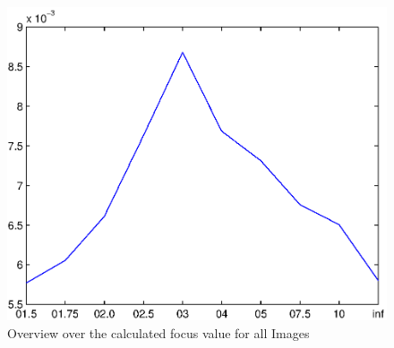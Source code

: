 \documentclass[
a4paper,     %
12pt         %
]{scrartcl}  %
\begin{document}
\begin{figure}[ht!]
 \centering
 \includegraphics{./Bildg_Messtechnik_Lab/Autofokus/html/main_01.eps}
 \caption{Overview over the calculated focus value for all Images}
 \label{fig:autofocus_hist}
\end{figure}
\end{document}
